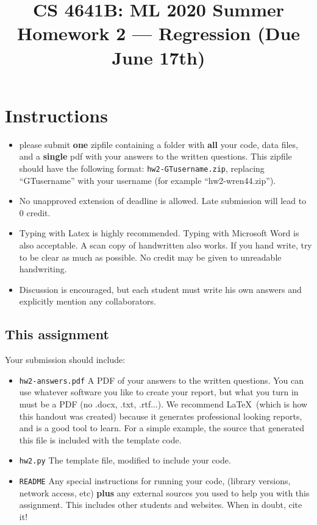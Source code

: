 \documentclass{article} %
\title{CS 4641B: ML 2020 Summer\\ 
Homework 2 --- Regression
(Due June 17th)
}
\date{}
\author{}
\begin{document}
\maketitle 

\newcommand{\bphnote}[1]{\textit{\textcolor{red}{#1}}}


\section*{Instructions} 
\begin{itemize}
    \item please submit \textbf{one} zipfile containing a folder with \textbf{all} your code, data files, and a \textbf{single} pdf with your answers to the written questions. This zipfile should have the following format: 
    \texttt{hw2-GTusername.zip}, replacing ``GTusername'' with your username (for example ``hw2-wren44.zip'').
    \item No unapproved extension of deadline is allowed. Late submission will lead to 0 credit.
    \item Typing with Latex is highly recommended. Typing with Microsoft Word is also acceptable. A scan copy of handwritten also works. If you hand write, try to be clear as much as possible. No credit may be given to unreadable handwriting.
    \item Discussion is encouraged, but each student must write his own answers and explicitly mention any collaborators.
\end{itemize}

\subsection*{This assignment}
Your submission should include:
\begin{itemize}
	\item \texttt{hw2-answers.pdf} A PDF of your answers to the written questions. You can use whatever software you like to create your report, but what you turn in must be a PDF (no .docx, .txt, .rtf...). We recommend \LaTeX~(which is how this handout was created) because it generates professional looking reports, and is a good tool to learn. For a simple example, the source that generated this file is included with the template code.
	\item \texttt{hw2.py} The template file, modified to include your code.
	\item \texttt{README} Any special instructions for running your code, (library versions, network access, etc) \textbf{plus}
	any external sources you used to help you with this assignment. This includes other students and websites. When in doubt, cite it!
\end{itemize}
\end{document}
